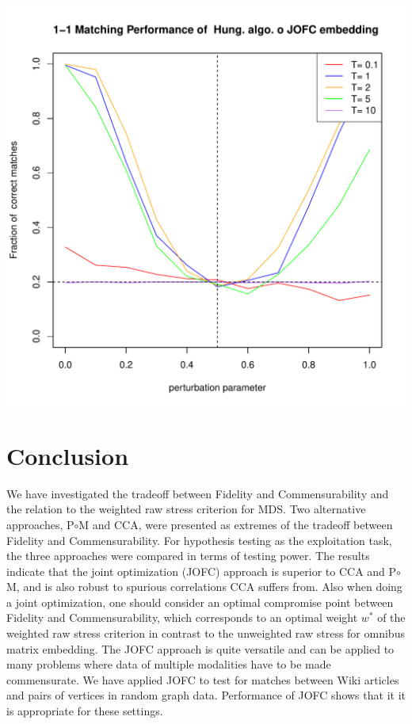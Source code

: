\documentclass[11pt]{article} %
\begin{document}
\begin{knitrout}
\color{fgcolor}\includegraphics{graphs/FidCommPapergraph-plot-5} 
\end{knitrout}






\section{Conclusion}
 We have investigated the tradeoff between Fidelity and Commensurability and the relation to the weighted raw stress criterion for MDS.
  Two alternative approaches, P$\circ$M and CCA, were presented as extremes of the tradeoff  between Fidelity and Commensurability.
   For  hypothesis testing as the exploitation task, the three approaches were compared in terms of testing power.
    The results indicate that the joint optimization (JOFC) approach is superior to CCA and  P$\circ$M,
     and is also robust to spurious correlations CCA suffers from.
      Also when doing a joint optimization, one should consider an optimal compromise point between Fidelity and Commensurability,
       which corresponds to an optimal weight $w^*$ of the weighted raw stress criterion in contrast to the unweighted raw stress 
        for omnibus matrix embedding. 
        The JOFC approach is quite versatile and can be applied to many problems where data of multiple modalities have to be made commensurate. 
        We have applied JOFC to  test for matches between Wiki articles and pairs of vertices in random graph data.  Performance of JOFC shows that it 
        it is appropriate for these settings.  







\end{document}
